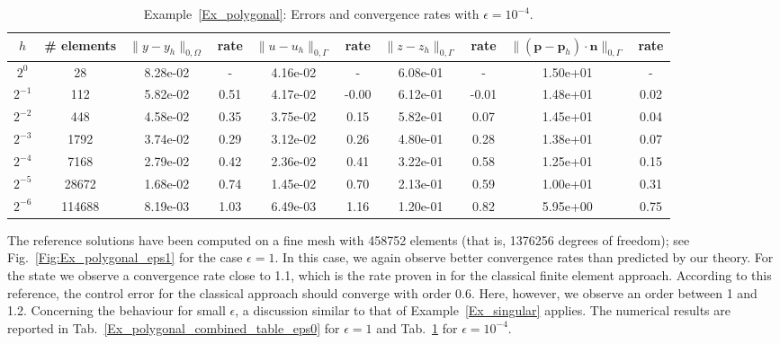 \documentclass[a4paper,10pt]{article}
\newcommand{\bp}{{\mathbf{p}}}
\numberwithin{theorem}{section}
\newcommand{\x}[2][blue]{#2}
\begin{document}
\begin{table}[H]
\centering
\caption{Example~\ref{Ex_polygonal}: Errors and convergence rates with $\epsilon=10^{-4}$.}
\resizebox{\textwidth}{!}
{%
\begin{tabular}{c |c | c c | c c | c c | c c}
$h$
&\# elements 
& $\|y-y_h\|_{0,\Omega}$ & rate
& $\|u-u_h\|_{0,\Gamma}$ & rate
& $\|z-z_h\|_{0,\Gamma}$ & rate
& $\|(\bp-\bp_h)\cdot \mathbf n\|_{0,\Gamma}$ & rate \\
\hline
$2^{0}$
&28     
& 8.28e-02 & -    
& 4.16e-02 & -    
& 6.08e-01 & -    
& 1.50e+01 & -    \\

$2^{-1}$
&112    
& 5.82e-02 & 0.51 
& 4.17e-02 & -0.00 
& 6.12e-01 & -0.01 
& 1.48e+01 & 0.02 \\

$2^{-2}$
&448    
& 4.58e-02 & 0.35 
& 3.75e-02 & 0.15 
& 5.82e-01 & 0.07 
& 1.45e+01 & 0.04 \\

$2^{-3}$
&1792   
& 3.74e-02 & 0.29 
& 3.12e-02 & 0.26 
& 4.80e-01 & 0.28 
& 1.38e+01 & 0.07 \\

$2^{-4}$
&7168   
& 2.79e-02 & 0.42 
& 2.36e-02 & 0.41 
& 3.22e-01 & 0.58 
& 1.25e+01 & 0.15 \\

$2^{-5}$
&28672  
& 1.68e-02 & 0.74 
& 1.45e-02 & 0.70 
& 2.13e-01 & 0.59 
& 1.00e+01 & 0.31 \\

$2^{-6}$
&114688 
& 8.19e-03 & 1.03 
& 6.49e-03 & 1.16 
& 1.20e-01 & 0.82 
& 5.95e+00 & 0.75 \\

\hline
\end{tabular}
}
\label{Ex_polygonal_combined_table_eps4}
\end{table}


The reference solutions have been computed on a fine mesh with 458752 elements (that is, 1376256 degrees of freedom); see Fig.~\ref{Fig:Ex_polygonal_eps1} for the case $\epsilon=1$. \x{In this case, we again observe better convergence rates than predicted by our theory. For the state we observe a convergence rate close to 1.1, which is the rate proven in \cite{SMay_RRannacher_BVexler_2013} for the classical finite element approach. According to this reference, the control error for the classical approach should converge with order 0.6. Here, however, we observe an order between 1 and 1.2. Concerning the behaviour for small $\epsilon$, a discussion similar to that of Example~\ref{Ex_singular} applies. The numerical results are reported in Tab.~\ref{Ex_polygonal_combined_table_eps0} for $\epsilon=1$ and Tab.~\ref{Ex_polygonal_combined_table_eps4} for $\epsilon=10^{-4}$.}
\end{document}
